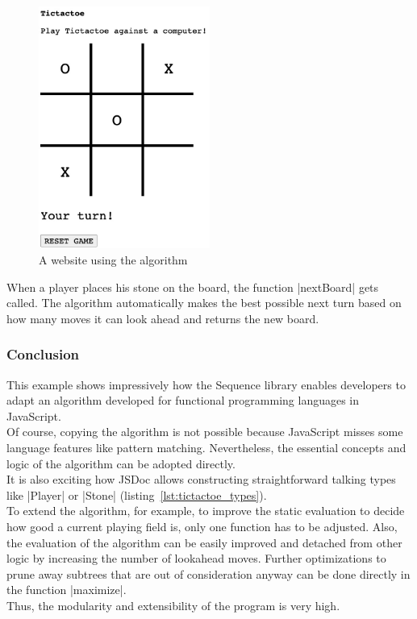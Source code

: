 \begin{figure}[H]
    \centering
    \includegraphics[width=0.5\textwidth]{./mainmatter/pictures/tic-tac-toe-field.jpg}
    \caption{A website using the algorithm}
    \label{img:ttt_playfield}
\end{figure}

When a player places his stone on the board, the function |nextBoard| gets
called. The algorithm automatically makes the best possible next turn based on
how many moves it can look ahead and returns the new board.

\subsubsection{Conclusion} %
\label{subsub:ttt_conclusion}
This example shows impressively how the Sequence library enables developers to
adapt an algorithm developed for functional programming languages in
JavaScript.\\
Of course, copying the algorithm is not possible because JavaScript misses some
language features like pattern matching. Nevertheless, the essential concepts
and logic of the algorithm can be adopted directly. \\
It is also exciting how JSDoc allows constructing straightforward talking types
like |Player| or |Stone| (listing~\ref{lst:tictactoe_types}).\\
To extend the algorithm, for example, to improve the static evaluation to
decide how good a current playing field is, only one function has to be
adjusted. Also, the evaluation of the algorithm can be easily improved and
detached from other logic by increasing the number of lookahead moves. Further
optimizations to prune away subtrees that are out of consideration anyway can
be done directly in the function |maximize|.\\
Thus, the modularity and extensibility of the program is very high.

